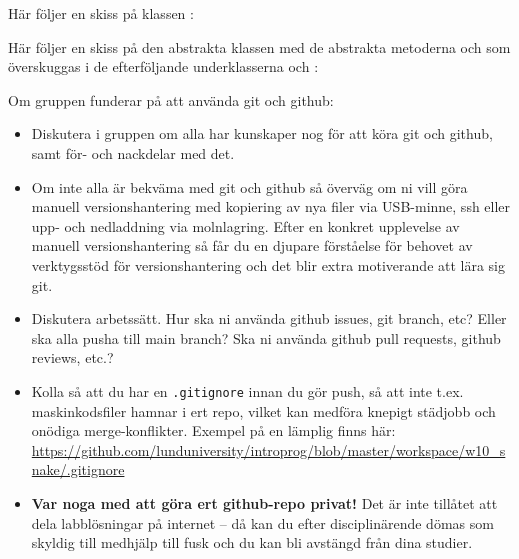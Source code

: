 Här följer en skiss på klassen :


Här följer en skiss på den abstrakta klassen  med de abstrakta metoderna  och  som överskuggas i de efterföljande underklasserna  och :


\vspace{1em}

Om gruppen funderar på att använda git och github: 
\begin{itemize}[nolistsep]
  \item Diskutera i gruppen om alla har kunskaper nog för att köra git och github, samt för- och nackdelar med det. 
  \item Om inte alla är bekväma med git och github så överväg om ni vill göra manuell versionshantering med kopiering av nya filer via USB-minne, ssh eller upp- och nedladdning via molnlagring. Efter en konkret upplevelse av manuell versionshantering så får du en djupare förståelse för behovet av verktygsstöd för versionshantering och det blir extra motiverande att lära sig git.
  \item Diskutera arbetssätt. Hur ska ni använda github issues, git branch, etc? Eller ska alla pusha till main branch? Ska ni använda github pull requests, github reviews, etc.?
  \item Kolla så att du har en \texttt{.gitignore} innan du gör push, så att inte t.ex. maskinkodsfiler hamnar i ert repo, vilket kan medföra knepigt städjobb och onödiga merge-konflikter. Exempel på en lämplig  finns här: \\\url{https://github.com/lunduniversity/introprog/blob/master/workspace/w10_snake/.gitignore} 
  \item \textbf{Var noga med att göra ert github-repo privat!} Det är inte tillåtet att dela labblösningar på internet -- då kan du efter disciplinärende dömas som skyldig till medhjälp till fusk och du kan bli avstängd från dina studier. 
\end{itemize}

